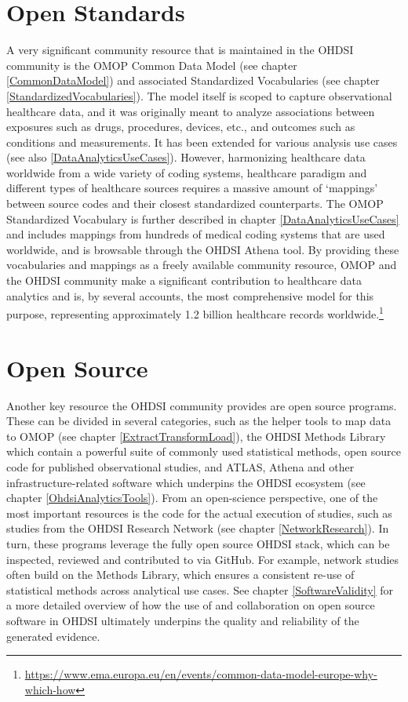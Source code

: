\documentclass[11pt]{book}
\let\rmarkdownfootnote\footnote%
\def\footnote{\protect\rmarkdownfootnote}
\theoremstyle{definition}
\theoremstyle{definition}
\theoremstyle{definition}
\theoremstyle{remark}
\begin{document}
\section{Open Standards}\label{open-standards}


A very significant community resource that is maintained in the OHDSI
community is the OMOP Common Data Model (see chapter
\ref{CommonDataModel}) and associated Standardized Vocabularies (see
chapter \ref{StandardizedVocabularies}). The model itself is scoped to
capture observational healthcare data, and it was originally meant to
analyze associations between exposures such as drugs, procedures,
devices, etc., and outcomes such as conditions and measurements. It has
been extended for various analysis use cases (see also
\ref{DataAnalyticsUseCases}). However, harmonizing healthcare data
worldwide from a wide variety of coding systems, healthcare paradigm and
different types of healthcare sources requires a massive amount of
`mappings' between source codes and their closest standardized
counterparts. The OMOP Standardized Vocabulary is further described in
chapter \ref{DataAnalyticsUseCases} and includes mappings from hundreds
of medical coding systems that are used worldwide, and is browsable
through the OHDSI Athena tool. By providing these vocabularies and
mappings as a freely available community resource, OMOP and the OHDSI
community make a significant contribution to healthcare data analytics
and is, by several accounts, the most comprehensive model for this
purpose, representing approximately 1.2 billion healthcare records
worldwide.\footnote{\url{https://www.ema.europa.eu/en/events/common-data-model-europe-why-which-how}}
\citep{garza_2016}

\section{Open Source}\label{open-source}


Another key resource the OHDSI community provides are open source
programs. These can be divided in several categories, such as the helper
tools to map data to OMOP (see chapter \ref{ExtractTransformLoad}), the
OHDSI Methods Library which contain a powerful suite of commonly used
statistical methods, open source code for published observational
studies, and ATLAS, Athena and other infrastructure-related software
which underpins the OHDSI ecosystem (see chapter
\ref{OhdsiAnalyticsTools}). From an open-science perspective, one of the
most important resources is the code for the actual execution of
studies, such as studies from the OHDSI Research Network (see chapter
\ref{NetworkResearch}). In turn, these programs leverage the fully open
source OHDSI stack, which can be inspected, reviewed and contributed to
via GitHub. For example, network studies often build on the Methods
Library, which ensures a consistent re-use of statistical methods across
analytical use cases. See chapter \ref{SoftwareValidity} for a more
detailed overview of how the use of and collaboration on open source
software in OHDSI ultimately underpins the quality and reliability of
the generated evidence.
\end{document}
